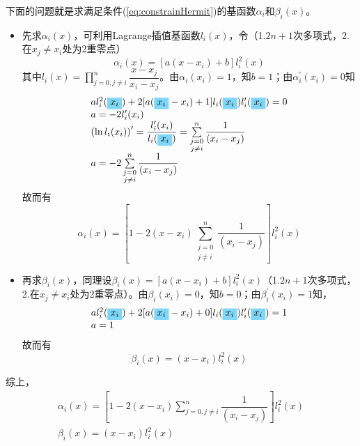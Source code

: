 \begin{note}
    下面的问题就是求满足条件(\ref{eq:constrainHermit})的基函数$\alpha_{i}$和$\beta_{i}(x)$。
    \begin{itemize}
        \item 先求$\alpha_{i}(x)$，可利用Lagrange插值基函数$l_{i}(x)$，令（1.$2n+1$次多项式，2.在$x_j \neq x_i$处为2重零点）
        \[
            \alpha_{i}(x) = [a(x-x_i)+b]l_{i}^2(x)
        \]
        其中$l_{i}(x) = \prod\limits_{j = 0,j\neq i}^{n}\dfrac{x-x_j}{x_i-x_j}$。由$\alpha_{i}(x_i) = 1$，知$b = 1$；由$\alpha_{i}^{\prime}(x_i) = 0$知
        \[
            \begin{array}{l}
                al_{i}^2(\colorbox{cyan!50}{$x_i$})+2[a(\colorbox{cyan!50}{$x_i$}-x_i)+1]l_{i}(\colorbox{cyan!50}{$x_i$})l_{i}^{\prime}(\colorbox{cyan!50}{$x_i$}) = 0\\
                a = -2l_{i}^{\prime}(x_i)\\
                \left( \ln l_{i}(x_i) \right)' = \dfrac{l_{i}^{\prime}(x_i)}{l_{i}(\colorbox{cyan!50}{$x_i$})} = \sum\limits_{\substack{j = 0\\j\neq i}}^{n}\dfrac{1}{(x_i-x_j)}\\
                a = -2\sum\limits_{\substack{j = 0\\j\neq i}}^{n}\dfrac{1}{(x_i-x_j)}\\
            \end{array}
        \]
        故而有
        \[
            \alpha_{i}(x) = \left[1-2(x-x_i)\sum\limits_{\substack{j = 0\\j\neq i}}^{n}\dfrac{1}{(x_i-x_j)}\right]l_{i}^2(x)
        \]
        \item 再求$\beta_{i}(x)$，同理设$\beta_{i}(x) = [a(x-x_i)+b]l_{i}^2(x)$（1.$2n+1$次多项式，2.在$x_j \neq x_i$处为2重零点）。由$\beta_{i}(x_i) = 0$，知$b = 0$；由$\beta_{i}^{\prime}(x_i) = 1$知，
        \[
            \begin{array}{l}
                al_{i}^2(\colorbox{cyan!50}{$x_i$})+2[a(\colorbox{cyan!50}{$x_i$}-x_i)+0]l_{i}(\colorbox{cyan!50}{$x_i$})l_{i}^{\prime}(\colorbox{cyan!50}{$x_i$}) = 1\\
                a = 1
            \end{array}
        \]
        故而有
        \[
            \beta_{i}(x) = (x-x_i)l_{i}^2(x)
        \]
    \end{itemize}
    综上，
    \[
        \begin{array}{l}
            \alpha_{i}(x) = \left[1-2(x-x_i)\sum\limits_{j = 0,j\neq i}^{n}\dfrac{1}{(x_i-x_j)}\right]l_{i}^2(x)\\
            \beta_{i}(x) = (x-x_i)l_{i}^2(x)
        \end{array}
    \]
\end{note}
